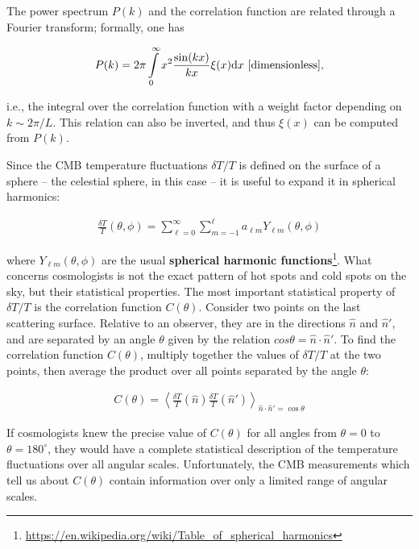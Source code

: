 \documentclass[a4paper,11pt]{article}
\begin{document}
{\noindent}The power spectrum $P(k)$ and the correlation function are related through a Fourier transform; formally, one has

\begin{align*}
    P(k) = 2\pi \int\limits_0^\infty x^2\frac{\sin(kx)}{kx}\xi(x)\mathrm{d}x ~ [{\rm dimensionless}],
\end{align*}

{\noindent}i.e., the integral over the correlation function with a weight factor depending on $k\sim2\pi/L$. This relation can also be inverted, and thus $\xi(x)$ can be computed from $P(k)$.

{\noindent}Since the CMB temperature fluctuations $\delta T/T$ is defined on the surface of a sphere -- the celestial sphere, in this case -- it is useful to expand it in spherical harmonics:

\begin{align*}
    \frac{\delta T}{T}(\theta,\phi) = \sum\limits_{\ell=0}^{\infty}\sum\limits_{m=-1}^{\ell} a_{\ell m}Y_{\ell m}(\theta,\phi)
\end{align*}

{\noindent}where $Y_{\ell m}(\theta,\phi)$ are the usual \textbf{spherical harmonic functions}\footnote{\href{https://en.wikipedia.org/wiki/Table\_of\_spherical\_harmonics}{https://en.wikipedia.org/wiki/Table\_of\_spherical\_harmonics}}. What concerns cosmologists is not the exact pattern of hot spots and cold spots on the sky, but their statistical properties. The most important statistical property of $\delta T/T$ is the correlation function $C(\theta)$. Consider two points on the last scattering surface. Relative to an observer, they are in the directions $\hat{n}$ and $\hat{n}'$, and are separated by an angle $\theta$ given by the relation $cos\theta=\hat{n}\cdot\hat{n}'$. To find the correlation function $C(\theta)$, multiply together the values of $\delta T/T$ at the two points, then average the product over all points separated by the angle $\theta$:

\begin{align*}
    C(\theta) = \left\langle\frac{\delta T}{T}(\hat{n})\frac{\delta T}{T}(\hat{n}')\right\rangle_{\hat{n}\cdot\hat{n}'=\cos\theta}
\end{align*}

{\noindent}If cosmologists knew the precise value of $C(\theta)$ for all angles from $\theta=0$ to $\theta=180^\circ$, they would have a complete statistical description of the temperature fluctuations over all angular scales. Unfortunately, the CMB measurements which tell us about $C(\theta)$ contain information over only a limited range of angular scales.
\end{document}
